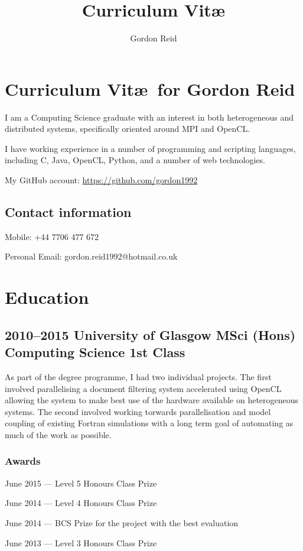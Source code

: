 \documentclass[11pt,a4paper]{article}
\title{Curriculum Vit\ae}
\author{Gordon Reid}
\begin{document}
\section*{Curriculum Vit\ae\ for Gordon Reid}

I am a Computing Science graduate with an interest in both heterogeneous and
distributed systems, specifically oriented around MPI and OpenCL\@.

I have working experience in a number of programming and scripting languages,
including C, Java, OpenCL, Python, and a number of web technologies.

My GitHub account: \url{https://github.com/gordon1992}

\subsection*{Contact information}
Mobile: +44 7706 477 672

Personal Email: gordon.reid1992@hotmail.co.uk

\section*{Education}

\subsection*{2010--2015 University of Glasgow MSci (Hons) Computing Science 1st Class}

As part of the degree programme, I had two individual projects. The first
involved parallelising a document filtering system accelerated using OpenCL allowing
the system to make best use of the hardware available on heterogeneous systems.
The second involved working torwards parallelisation and model coupling of
existing Fortran simulations with a long term goal of automating as much of the
work as possible.

\subsubsection*{Awards}

June 2015 --- Level 5 Honours Class Prize

June 2014 --- Level 4 Honours Class Prize

June 2014 --- BCS Prize for the project with the best evaluation

June 2013 --- Level 3 Honours Class Prize
\end{document}
